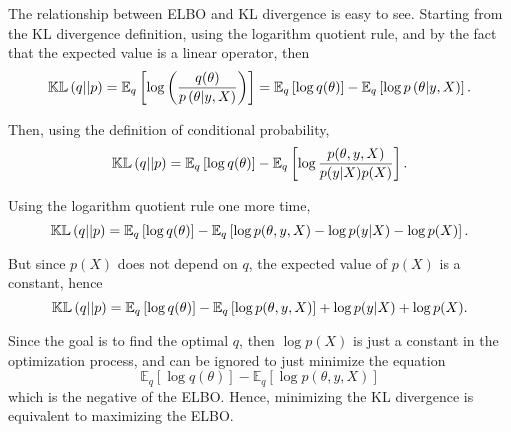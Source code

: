 The relationship between ELBO and KL divergence is easy to see. Starting from the KL divergence definition, using the logarithm quotient rule, and by the fact that the expected value is a linear operator, then
\begin{equation}
    \mathbb{KL}\left( q || p \right) =
    \mathbb{E}_q \left[ \log \left( \frac{q(\theta)}{p\left( \theta | y, X \right)} \right) \right] =
    \mathbb{E}_q \left[ \log  q(\theta) \right] - \mathbb{E}_q \left[ \log {p\left( \theta | y, X \right)}  \right].
\end{equation}

Then, using the definition of conditional probability,
\begin{equation}
    \mathbb{KL}\left( q || p \right) =
    \mathbb{E}_q \left[ \log  q(\theta) \right] - \mathbb{E}_q \left[ \log \frac{p(\theta, y, X)}{p(y | X) p(X)}  \right].
\end{equation}

Using the logarithm quotient rule one more time,
\begin{equation}
  \mathbb{KL}\left( q || p \right) =
  \mathbb{E}_q \left[ \log  q(\theta) \right] - \mathbb{E}_q \left[ \log p(\theta, y, X) - \log p(y | X) - \log p(X)  \right].
\end{equation}

But since $p(X)$ does not depend on $q$, the expected value of $p(X)$ is a constant, hence
\begin{equation}
 \mathbb{KL}\left( q || p \right) =
 \mathbb{E}_q \left[ \log  q(\theta) \right] - \mathbb{E}_q \left[ \log p(\theta, y, X) \right] + \log p(y | X) + \log p(X).
\end{equation}

Since the goal is to find the optimal $q$, then $\log p(X)$ is just a constant in the optimization process, and can be ignored to just minimize the equation
\begin{equation}
  \mathbb{E}_q \left[ \log  q(\theta) \right] - \mathbb{E}_q \left[ \log p(\theta, y, X) \right]
\end{equation}
which is the negative of the ELBO. Hence, minimizing the KL divergence is equivalent to maximizing the ELBO.

